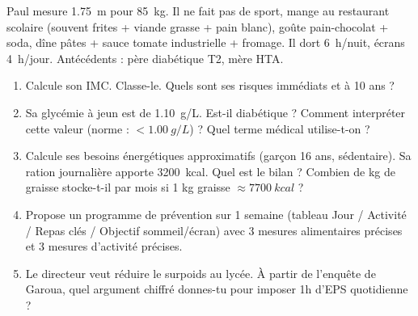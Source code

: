 \documentclass[11pt]{article}
\begin{document}
\begin{exercice}
Paul mesure \SI{1,75}{m} pour \SI{85}{kg}. Il ne fait pas de sport, mange au restaurant scolaire (souvent frites + viande grasse + pain blanc), goûte pain-chocolat + soda, dîne pâtes + sauce tomate industrielle + fromage. Il dort \SI{6}{h}/nuit, écrans \SI{4}{h}/jour. Antécédents : père diabétique T2, mère HTA.
\begin{enumerate}
\item Calcule son IMC. Classe-le. Quels sont ses risques immédiats et à 10 ans ?
\item Sa glycémie à jeun est de \SI{1,10}{g/L}. Est-il diabétique ? Comment interpréter cette valeur (norme : $< \SI{1,00}{g/L}$) ? Quel terme médical utilise-t-on ?
\item Calcule ses besoins énergétiques approximatifs (garçon 16 ans, sédentaire). Sa ration journalière apporte \SI{3200}{kcal}. Quel est le bilan ? Combien de kg de graisse stocke-t-il par mois si 1 kg graisse $\approx \SI{7700}{kcal}$ ?
\item Propose un programme de prévention sur 1 semaine (tableau Jour / Activité / Repas clés / Objectif sommeil/écran) avec 3 mesures alimentaires précises et 3 mesures d'activité précises.
\item Le directeur veut réduire le surpoids au lycée. À partir de l'enquête de Garoua, quel argument chiffré donnes-tu pour imposer 1h d'EPS quotidienne ?
\end{enumerate}
\end{exercice}
\end{document}
